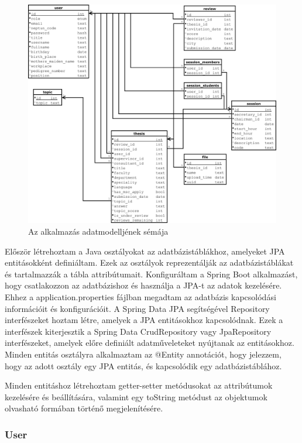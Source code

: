 \begin{figure}[ht]
	\includegraphics[width=\textwidth]{images/Adatmodell.pdf}
	\caption{Az alkalmazás adatmodelljének sémája}
	\label{fig:datamodel}
\end{figure}


Először létrehoztam a Java\cite{java} osztályokat az adatbázistáblákhoz, amelyeket JPA entitásokként definiáltam. Ezek az osztályok reprezentálják az adatbázistáblákat és tartalmazzák a tábla attribútumait. Konfiguráltam a Spring Boot\cite{spring_boot} alkalmazást, hogy csatlakozzon az adatbázishoz és használja a JPA-t az adatok kezelésére. Ehhez a application.properties fájlban megadtam az adatbázis kapcsolódási információit és konfigurációit. A Spring Data JPA segítségével Repository interfészeket hoztam létre, amelyek a JPA entitásokhoz kapcsolódnak. Ezek a interfészek kiterjesztik a Spring Data CrudRepository vagy JpaRepository interfészeket, amelyek előre definiált adatműveleteket nyújtanak az entitásokhoz. Minden entitás osztályra alkalmaztam az @Entity annotációt, hogy jelezzem, hogy az adott osztály egy JPA entitás, és kapcsolódik egy adatbázistáblához.


Minden entitáshoz létrehoztam getter-setter metódusokat az attribútumok kezelésére és beállítására, valamint egy toString metódust az objektumok olvasható formában történő megjelenítésére.

\subsubsection{User}

